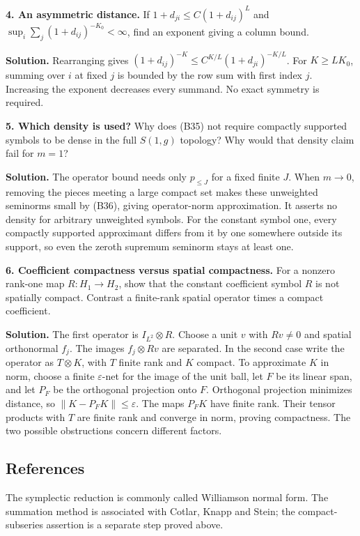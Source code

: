 \documentclass[
  11pt,
]{article}
\begin{document}
\textbf{4. An asymmetric distance.} If \(1+d_{ji}\le C(1+d_{ij})^L\) and
\(\sup_i\sum_j(1+d_{ij})^{-K_0}<\infty\), find an exponent giving a
column bound.

\textbf{Solution.} Rearranging gives
\((1+d_{ij})^{-K}\le C^{K/L}(1+d_{ji})^{-K/L}\). For \(K\ge LK_0\),
summing over \(i\) at fixed \(j\) is bounded by the row sum with first
index \(j\). Increasing the exponent decreases every summand. No exact
symmetry is required.

\textbf{5. Which density is used?} Why does (B35) not require compactly
supported symbols to be dense in the full \(S(1,g)\) topology? Why would
that density claim fail for \(m=1\)?

\textbf{Solution.} The operator bound needs only \(p_{\le J}\) for a
fixed finite \(J\). When \(m\to0\), removing the pieces meeting a large
compact set makes these unweighted seminorms small by (B36), giving
operator-norm approximation. It asserts no density for arbitrary
unweighted symbols. For the constant symbol one, every compactly
supported approximant differs from it by one somewhere outside its
support, so even the zeroth supremum seminorm stays at least one.

\textbf{6. Coefficient compactness versus spatial compactness.} For a
nonzero rank-one map \(R:H_1\to H_2\), show that the constant
coefficient symbol \(R\) is not spatially compact. Contrast a
finite-rank spatial operator times a compact coefficient.

\textbf{Solution.} The first operator is \(I_{L^2}\otimes R\). Choose a
unit \(v\) with \(Rv\ne0\) and spatial orthonormal \(f_j\). The images
\(f_j\otimes Rv\) are separated. In the second case write the operator
as \(T\otimes K\), with \(T\) finite rank and \(K\) compact. To
approximate \(K\) in norm, choose a finite \(\varepsilon\)-net for the
image of the unit ball, let \(F\) be its linear span, and let \(P_F\) be
the orthogonal projection onto \(F\). Orthogonal projection minimizes
distance, so \(\|K-P_FK\|\le\varepsilon\). The maps \(P_FK\) have finite
rank. Their tensor products with \(T\) are finite rank and converge in
norm, proving compactness. The two possible obstructions concern
different factors.

\subsection{References}\label{references}

The symplectic reduction is commonly called Williamson normal form. The
summation method is associated with Cotlar, Knapp and Stein; the
compact-subseries assertion is a separate step proved above.
\end{document}
